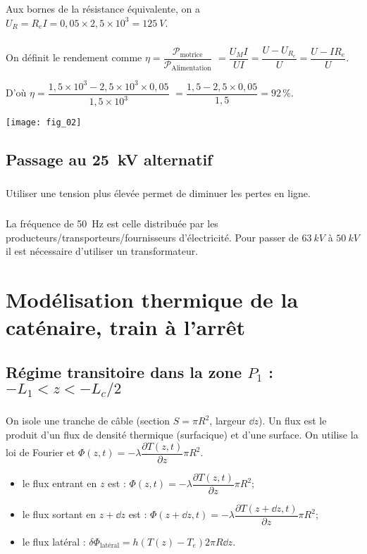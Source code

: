 \subparagraph{}
Aux bornes de la résistance équivalente, on a $U_R = R_e I =0,05 \times 2,5 \times 10^3= \SI{125}{V}$.



\subparagraph{}
On définit le rendement comme $\eta = \dfrac{\mathcal{P}_{\text{motrice}}}{\mathcal{P}_{\text{Alimentation}}}$
$ = \dfrac{U_M I}{U I} = \dfrac{U-U_ {R_e}}{U}= \dfrac{U-I R_e}{U}$. 

D'où $\eta = \dfrac{1,5\times 10^3 - 2,5\times 10^3 \times 0,05}{1,5\times 10^3}$ $= \dfrac{1,5 - 2,5 \times 0,05}{1,5}=92\, \%$.
\begin{center}
\texttt{[image: fig\_02]}
\end{center}

\subsection{Passage au \SI{25}{kV} alternatif}
\subparagraph{}
Utiliser une tension plus élevée permet de diminuer les pertes en ligne.

\subparagraph{}
La fréquence de \SI{50}{Hz} est celle distribuée par les producteurs/transporteurs/fournisseurs d'électricité. 
Pour passer de $\SI{63}{kV}$ à $\SI{50}{kV}$ il est nécessaire d'utiliser un transformateur.

\section{Modélisation thermique de la caténaire, train à l’arrêt}

\subsection{ Régime transitoire dans la zone $P_1$ : $- L_1 <z < -L_c /2$}

\subparagraph{}
On isole une tranche de câble (section $S=\pi R^2$, largeur $\dd z$).
Un flux est le produit d'un flux de densité thermique (surfacique) et d'une surface. On utilise la loi de Fourier et 
$\Phi(z,t)=-\lambda \dfrac{\partial T(z,t)}{\partial z}\pi R^2$.

\begin{itemize}
\item le flux entrant en $z$ est : $\Phi(z,t)=-\lambda \dfrac{\partial T(z,t)}{\partial z}\pi R^2$;
\item le flux sortant en $z+\dd z$ est : $\Phi(z+\dd z,t)=-\lambda \dfrac{\partial T(z+\dd z,t)}{\partial z}\pi R^2$;
\item le flux latéral : $\delta \Phi_{\text{latéral}}=h\left(T(z)-T_e \right)2\pi R \dd z$.
\end{itemize}
\subparagraph{}

